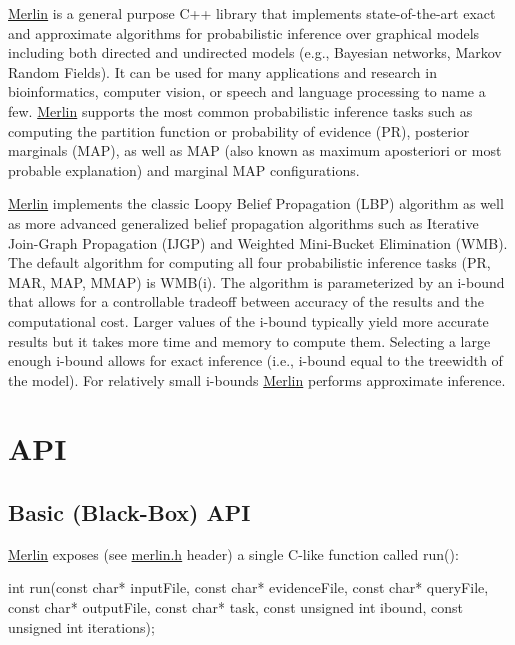 \hyperlink{classMerlin}{Merlin} is a general purpose {\ttfamily C++} library that implements state-\/of-\/the-\/art exact and approximate algorithms for probabilistic inference over graphical models including both directed and undirected models (e.\+g., Bayesian networks, Markov Random Fields). It can be used for many applications and research in bioinformatics, computer vision, or speech and language processing to name a few. \hyperlink{classMerlin}{Merlin} supports the most common probabilistic inference tasks such as computing the partition function or probability of evidence (P\+R), posterior marginals (M\+A\+P), as well as M\+A\+P (also known as maximum aposteriori or most probable explanation) and marginal M\+A\+P configurations.

\hyperlink{classMerlin}{Merlin} implements the classic Loopy Belief Propagation (L\+B\+P) algorithm as well as more advanced generalized belief propagation algorithms such as Iterative Join-\/\+Graph Propagation (I\+J\+G\+P) and Weighted Mini-\/\+Bucket Elimination (W\+M\+B). The default algorithm for computing all four probabilistic inference tasks (P\+R, M\+A\+R, M\+A\+P, M\+M\+A\+P) is W\+M\+B(i). The algorithm is parameterized by an i-\/bound that allows for a controllable tradeoff between accuracy of the results and the computational cost. Larger values of the i-\/bound typically yield more accurate results but it takes more time and memory to compute them. Selecting a large enough i-\/bound allows for exact inference (i.\+e., i-\/bound equal to the treewidth of the model). For relatively small i-\/bounds \hyperlink{classMerlin}{Merlin} performs approximate inference.

\section*{A\+P\+I}

\subsection*{Basic (Black-\/\+Box) A\+P\+I}

\hyperlink{classMerlin}{Merlin} exposes (see {\ttfamily \hyperlink{merlin_8h_source}{merlin.\+h}} header) a single C-\/like function called {\ttfamily run()}\+: \begin{DoxyVerb}    int run(const char* inputFile, 
        const char* evidenceFile, 
        const char* queryFile, 
        const char* outputFile, 
        const char* task, 
        const unsigned int ibound, 
        const unsigned int iterations);
\end{DoxyVerb}


